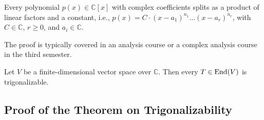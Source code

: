 \begin{theorem} \label{thm:fta}
  Every polynomial $p(x) \in \mathbb{C}[x]$ with complex coefficients splits as a product of linear factors and a constant, i.e.,
  $p(x) = C \cdot (x-a_1)^{n_1} \dots (x-a_r)^{n_r}$, with $C \in \mathbb{C}$, $r \ge 0$, and $a_i \in \mathbb{C}$.
\end{theorem}

\begin{remark}\label{rem:fta_proof}
  The proof is typically covered in an analysis course or a complex analysis course in the third semester.
\end{remark}

\begin{corollary}\label{cor:complex_trigonalizable}
  Let $V$ be a finite-dimensional vector space over $\mathbb{C}$. Then every $T \in \operatorname{End}(V)$ is trigonalizable.
\end{corollary}

\subsection{Proof of the Theorem on Trigonalizability}

